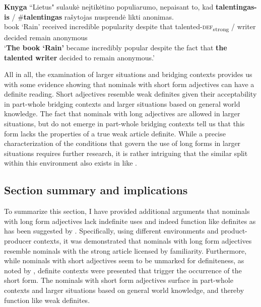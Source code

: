 \documentclass[output=paper,
modfonts
]{langscibook}
\begin{document}
\begin{exe}
	\ex \label{ex:sereikaite:56}
	\gll \textbf{{Knyga}} ``{Lietus}" {sulaukė} {neįtikėtino} {populiarumo}, {nepaisant} {to}, {kad} \textbf{talentingas-is} \textnormal{/} \textnormal{\#}\textbf{talentingas} {rašytojas} {nusprendė} {likti} {anonimas}.\\
	{book} `Rain' received incredible popularity despite {} that {talented-\textsc{def}\textsubscript{strong}} /  writer decided remain anonymous\\
	\trans `\textbf{The book `Rain'} became incredibly popular despite the fact that \textbf{the talented writer} decided to remain anonymous.' 
\end{exe} 

All in all, the examination of larger situations and bridging contexts provides us with some evidence showing that nominals with short form adjectives can have a definite reading. Short adjectives resemble weak definites given their acceptability in part-whole bridging contexts and larger situations based on general world knowledge. The fact that nominals with long adjectives are allowed in larger situations, but do not emerge in part-whole bridging contexts tell us that this form lacks the properties of a true weak article definite. While a precise characterization of the conditions that govern the use of long forms in larger situations requires further research, it is rather intriguing that the similar split within this environment also exists in  like . 

\subsection{Section summary and implications}

To summarize this section, I have provided additional arguments that nominals with long form adjectives lack indefinite uses and indeed function like definites as has been suggested by \citet{GillonArmoskaite2015}. Specifically, using different  environments and product-producer  contexts, it was demonstrated that nominals with long form adjectives resemble  nominals with the strong article licensed by familiarity. Furthermore, while nominals with short adjectives seem to be unmarked for definiteness, as noted by \citet{Ambrazas1997}, definite contexts were presented that trigger the occurrence of the short form. The nominals with short form adjectives surface in part-whole  contexts and larger situations based on general world knowledge, and thereby function like weak definites.
 
\end{document}
